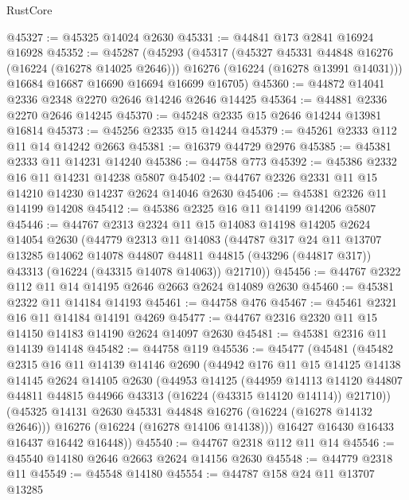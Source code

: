 \begin{lexlean}{RustCore}
\begin{coremodule}
@45327 := @45325 @14024 @2630
@45331 := @44841 @173 @2841 @16924 @16928
@45352 := @45287
    (@45293
      (@45317
        (@45327 @45331 @44848 @16276 (@16224 (@16278 @14025 @2646)))
        @16276
        (@16224 (@16278 @13991 @14031)))
      @16684
      @16687
      @16690
      @16694
      @16699
      @16705)
@45360 := @44872 @14041 @2336 @2348 @2270 @2646 @14246 @2646 @14425
@45364 := @44881 @2336 @2270 @2646 @14245
@45370 := @45248 @2335 @15 @2646 @14244 @13981 @16814
@45373 := @45256 @2335 @15 @14244
@45379 := @45261 @2333 @112 @11 @14 @14242 @2663
@45381 := @16379 @44729 @2976
@45385 := @45381 @2333 @11 @14231 @14240
@45386 := @44758 @773
@45392 := @45386 @2332 @16 @11 @14231 @14238 @5807
@45402 := @44767 @2326 @2331 @11 @15 @14210 @14230 @14237 @2624 @14046 @2630
@45406 := @45381 @2326 @11 @14199 @14208
@45412 := @45386 @2325 @16 @11 @14199 @14206 @5807
@45446 := @44767
    @2313
    @2324
    @11
    @15
    @14083
    @14198
    @14205
    @2624
    @14054
    @2630
    (@44779
      @2313
      @11
      @14083
      (@44787
        @317
        @24
        @11
        @13707
        @13285
        @14062
        @14078
        @44807
        @44811
        @44815
        (@43296 (@44817 @317))
        @43313
        (@16224 (@43315 @14078 @14063))
        @21710))
@45456 := @44767 @2322 @112 @11 @14 @14195 @2646 @2663 @2624 @14089 @2630
@45460 := @45381 @2322 @11 @14184 @14193
@45461 := @44758 @476
@45467 := @45461 @2321 @16 @11 @14184 @14191 @4269
@45477 := @44767 @2316 @2320 @11 @15 @14150 @14183 @14190 @2624 @14097 @2630
@45481 := @45381 @2316 @11 @14139 @14148
@45482 := @44758 @119
@45536 := @45477
    (@45481
      (@45482
        @2315
        @16
        @11
        @14139
        @14146
        @2690
        (@44942
          @176
          @11
          @15
          @14125
          @14138
          @14145
          @2624
          @14105
          @2630
          (@44953
            @14125
            (@44959
              @14113
              @14120
              @44807
              @44811
              @44815
              @44966
              @43313
              (@16224 (@43315 @14120 @14114))
              @21710))
          (@45325 @14131 @2630 @45331 @44848 @16276 (@16224 (@16278 @14132 @2646)))
          @16276
          (@16224 (@16278 @14106 @14138)))
        @16427
        @16430
        @16433
        @16437
        @16442
        @16448))
@45540 := @44767 @2318 @112 @11 @14
@45546 := @45540 @14180 @2646 @2663 @2624 @14156 @2630
@45548 := @44779 @2318 @11
@45549 := @45548 @14180
@45554 := @44787 @158 @24 @11 @13707 @13285

\end{coremodule}
\end{lexlean}
